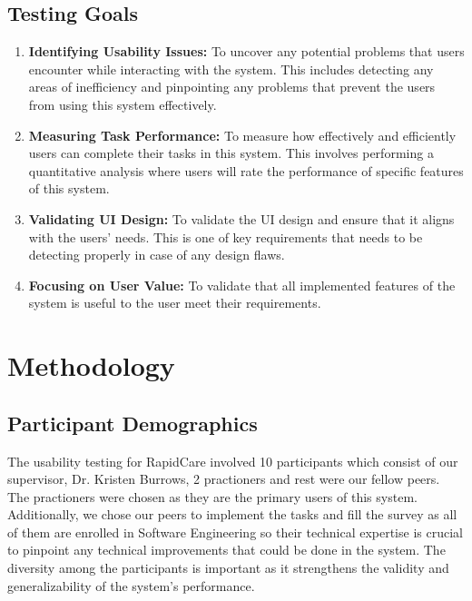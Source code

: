 \documentclass{article}
\begin{document}
\subsection{Testing Goals}

\begin{enumerate}
    \item \textbf{Identifying Usability Issues:} To uncover any potential problems that users encounter while interacting with the system. This includes detecting any areas of inefficiency and pinpointing any problems that prevent the users from using this system effectively.
    \item \textbf{Measuring Task Performance:} To measure how effectively and efficiently users can complete their tasks in this system. This involves performing a quantitative analysis where users will rate the performance of specific features of this system.
    \item \textbf{Validating UI Design:} To validate the UI design and ensure that it aligns with the users' needs. This is one of key requirements that needs to be detecting properly in case of any design flaws.
    \item \textbf{Focusing on User Value:} To validate that all implemented features of the system is useful to the user meet their requirements.
\end{enumerate}

\newpage

\section{Methodology}

\subsection{Participant Demographics}

The usability testing for RapidCare involved 10 participants which consist of our supervisor, Dr. Kristen Burrows, 2 practioners and rest were our fellow peers. The practioners were chosen as they are the primary users of this system. Additionally, we chose our peers to implement the tasks and fill the survey as all of them are enrolled in Software Engineering so their technical expertise is crucial to pinpoint any technical improvements that could be done in the system. The diversity among the participants is important as it strengthens the validity and generalizability of the system's performance.      
\end{document}
